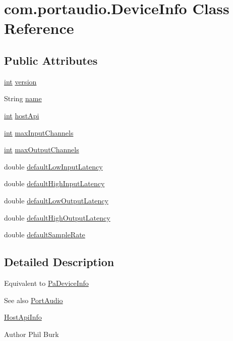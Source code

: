\hypertarget{classcom_1_1portaudio_1_1_device_info}{}\section{com.\+portaudio.\+Device\+Info Class Reference}
\label{classcom_1_1portaudio_1_1_device_info}
\subsection*{Public Attributes}
\begin{DoxyCompactItemize}
\item 
\hyperlink{xmltok_8h_a5a0d4a5641ce434f1d23533f2b2e6653}{int} \hyperlink{classcom_1_1portaudio_1_1_device_info_a18afde8a6a94652250413d0cc45b24da}{version}
\item 
String \hyperlink{classcom_1_1portaudio_1_1_device_info_a806cc9c750deacab1880e058bb936c86}{name}
\item 
\hyperlink{xmltok_8h_a5a0d4a5641ce434f1d23533f2b2e6653}{int} \hyperlink{classcom_1_1portaudio_1_1_device_info_a45a4a2b175089e351e5e75b26c37e9ff}{host\+Api}
\item 
\hyperlink{xmltok_8h_a5a0d4a5641ce434f1d23533f2b2e6653}{int} \hyperlink{classcom_1_1portaudio_1_1_device_info_a3f142c0507638c18b8d27215242b52ba}{max\+Input\+Channels}
\item 
\hyperlink{xmltok_8h_a5a0d4a5641ce434f1d23533f2b2e6653}{int} \hyperlink{classcom_1_1portaudio_1_1_device_info_a4e1e8f26ec3af7198cd11c4c6e2425d0}{max\+Output\+Channels}
\item 
double \hyperlink{classcom_1_1portaudio_1_1_device_info_a5cb2e27dea2b8db87332b94cc6e3ff7b}{default\+Low\+Input\+Latency}
\item 
double \hyperlink{classcom_1_1portaudio_1_1_device_info_a26851d2e68027020ed26e63d53d0a536}{default\+High\+Input\+Latency}
\item 
double \hyperlink{classcom_1_1portaudio_1_1_device_info_ac158722c527f2e16dbda940e0db6b2bf}{default\+Low\+Output\+Latency}
\item 
double \hyperlink{classcom_1_1portaudio_1_1_device_info_a24a8f3ef139f4a7eeaac28f284a72500}{default\+High\+Output\+Latency}
\item 
double \hyperlink{classcom_1_1portaudio_1_1_device_info_a3fd00524342f5eeeca0fff865bee32a1}{default\+Sample\+Rate}
\end{DoxyCompactItemize}


\subsection{Detailed Description}
Equivalent to \hyperlink{struct_pa_device_info}{Pa\+Device\+Info} \begin{DoxySeeAlso}{See also}
\hyperlink{classcom_1_1portaudio_1_1_port_audio}{Port\+Audio} 

\hyperlink{classcom_1_1portaudio_1_1_host_api_info}{Host\+Api\+Info} 
\end{DoxySeeAlso}
\begin{DoxyAuthor}{Author}
Phil Burk 
\end{DoxyAuthor}


